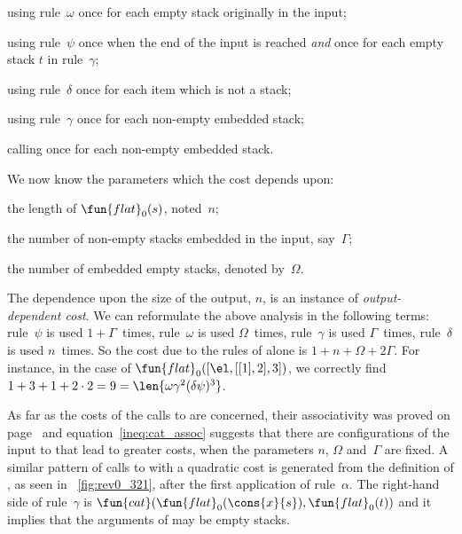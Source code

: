 \begin{itemize*}

  \item using rule~\(\omega\) once for each empty stack originally in
    the input;

  \item using rule~\(\psi\) once when the end of the input is reached
    \emph{and} once for each empty stack \(t\) in rule~\(\gamma\);

  \item using rule~\(\delta\) once for each item which is not a stack;

  \item using rule~\(\gamma\) once for each non\hyp{}empty embedded
    stack;

  \item calling  once for each
    non\hyp{}empty embedded stack.

\end{itemize*}
We now know the parameters which the cost depends upon:
\begin{enumerate*}

  \item the length of
    \(\fun{flat}_0(s)\), noted~\(n\);

  \item the number of non\hyp{}empty stacks embedded in the input,
    say~\(\Gamma\);

  \item the number of embedded empty stacks, denoted by~\(\Omega\).

\end{enumerate*}
The dependence upon the size of the output, \(n\), is an instance of
\emph{output\hyp{}dependent cost}. We can reformulate the above analysis in the following
terms: rule~\(\psi\) is used \(1 + \Gamma\)~times, rule~\(\omega\) is
used \(\Omega\)~times, rule~\(\gamma\) is used \(\Gamma\)~times,
rule~\(\delta\) is used \(n\)~times. So the cost due to the rules of
 alone is \(1 + n +
\Omega + 2\Gamma\). For instance, in the case of
\(\fun{flat}_0([\el,[[1],2],3])\), we correctly find \(1 + 3 + 1 + 2
\cdot 2 = 9 = \len{\omega\gamma^2(\delta\psi)^3}\).

As far as the costs of the calls to  are concerned, their
associativity was proved on
page~\pageref{proof:assoc_cat} and equation~\eqref{ineq:cat_assoc}
 suggests that there are configurations of
the input to  that
lead to greater costs, when the parameters \(n\), \(\Omega\)
and~\(\Gamma\) are fixed. A similar pattern of calls to
 with a quadratic cost is generated
from the definition of
, as seen in
\fig~\vref{fig:rev0_321}, after the first application of
rule~\(\alpha\). The right\hyp{}hand side of rule~\(\gamma\) is
\(\fun{cat}(\fun{flat}_0(\cons{x}{s}),\fun{flat}_0(t))\)
 and it implies that the arguments of
 may be empty stacks.

